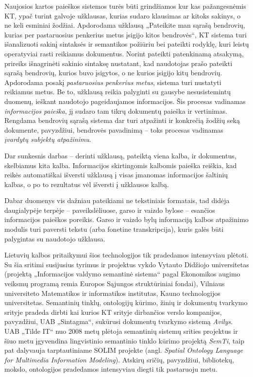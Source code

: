 \documentclass[]{../metanetpaper}
\begin{document}
\begin{multicols}{2}
Naujosios kartos paieškos sistemos turės būti grindžiamos kur kas pažangesnėmis KT, ypač turint galvoje užklausas, kurias sudaro klausimas ar kitoks sakinys, o ne keli esminiai žodžiai. Apdorodama užklausą „Pateikite man sąrašą bendrovių, kurias per pastaruosius penkerius metus įsigijo kitos bendrovės“, KT sistema turi išanalizuoti sakinį sintaksės ir semantikos požiūriu bei pateikti rodyklę, kuri leistų operatyviai rasti reikiamus dokumentus. Norint pateikti patenkinamą atsakymą, prireiks išnagrinėti sakinio sintaksę nustatant, kad naudotojas prašo pateikti sąrašą bendrovių, kurios buvo įsigytos, o ne kurios įsigijo kitų bendrovių. Apdorodama posakį \textit{pastaruosius penkerius metus}, sistema turi nustatyti reikiamus metus. Be to, užklausą reikia palyginti su gausybe nesusistemintų duomenų, ieškant naudotojo pageidaujamos informacijos. Šis procesas vadinamas \textit{informacijos paieška}, jį sudaro tam tikrų dokumentų paieška ir vertinimas. Rengdama bendrovių sąrašą sistema dar turi atpažinti ir konkrečią žodžių seką dokumente, pavyzdžiui, bendrovės pavadinimą – toks procesas vadinamas \textit{įvardytų subjektų atpažinimu}.  


Dar sunkesnis darbas – derinti užklausą, pateiktą viena kalba, ir dokumentus, skelbiamus kita kalba. Informacijos skirtingomis kalbomis paieška reiškia, kad reikės automatiškai išversti užklausą į visas įmanomas informacijos šaltinių kalbas, o po to rezultatus vėl išversti į užklausos kalbą.   

    Dabar duomenys vis dažniau pateikiami ne tekstiniais formatais, tad didėja daugialypėje terpėje – paveikslėliuose, garso ir vaizdo bylose – esančios informacijos paieškos poreikis. Garso ir vaizdo bylų informaciją kalbos atpažinimo modulis turi paversti tekstu (arba fonetine transkripcija), kuris galės būti palygintas su naudotojo užklausa.   

    Lietuvių kalbos pritaikymui šios technologijos tik pradedamos intensyviau plėtoti. Su šia sritimi susijusius tyrimus ir projektus vykdo Vytauto Didžiojo universitetas (projektą „Informacijos valdymo semantinė sistema“ pagal Ekonomikos augimo veiksmų programą remia Europos Sąjungos struktūriniai fondai), Vilniaus universiteto Matematikos ir informatikos institutas, Kauno technologijos universitetas. Semantinių tinklų, ontologijų kūrimo, žinių ir dokumentų tvarkymo srityje pradeda dirbti kai kurios KT srityje dirbančios verslo kompanijos, pavyzdžiui, UAB „Sintagma“, sukūrusi dokumentų tvarkymo sistemą \textit{Avilys}. UAB „Tilde IT“ nuo 2008 metų plėtoja semantinių sistemų srities projektus ir šiuo metu įgyvendina lingvistinio semantinio tinklo kūrimo projektą \textit{SemTi}, taip pat dalyvauja tarptautiniame SOLIM projekte (angl. \textit{Spatial Ontology Language for Multimedia Information Modeling}). Atskirų sričių, pavyzdžiui, bibliotekų, mokslo, ontologijos pradedamos intensyviau diegti tik pastaruoju metu.   


\end{multicols}
\end{document}
